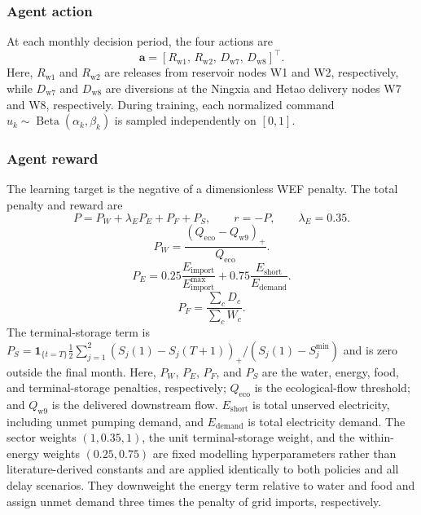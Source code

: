 \documentclass [a4paper,fleqn] {cas-dc}
\begin{document}
\subsubsection{Agent action}
\label{sec321}
At each monthly decision period, the four actions are
\begin{equation}
  \mathbf a=[R_{\mathrm{w1}},\,R_{\mathrm{w2}},\,D_{\mathrm{w7}},\,D_{\mathrm{w8}}]^{\top}.
  \label{eq:action-vector}
\end{equation}
Here, $R_{\mathrm{w1}}$ and $R_{\mathrm{w2}}$ are releases from reservoir nodes W1 and W2, respectively, while $D_{\mathrm{w7}}$ and $D_{\mathrm{w8}}$ are diversions at the Ningxia and Hetao delivery nodes W7 and W8, respectively. During training, each normalized command $u_k\sim\operatorname{Beta}(\alpha_k,\beta_k)$ is sampled independently on $[0,1]$. 


\subsubsection{Agent reward}
\label{sec322}

The learning target is the negative of a dimensionless WEF penalty. The total penalty and reward are
\begin{equation}
  P=P_W+\lambda_E P_E+P_F+P_S,
  \qquad r=-P,
  \qquad \lambda_E=0.35.
  \label{eq:wef-reward}
\end{equation}
\begin{equation}
  P_W=\frac{\left(Q_{\mathrm{eco}}-Q_{\mathrm{w9}}\right)_+}{Q_{\mathrm{eco}}}.
  \label{eq:water-penalty}
\end{equation}
\begin{equation}
  P_E=0.25\frac{E_{\mathrm{import}}}{E_{\mathrm{import}}^{\max}}
      +0.75\frac{E_{\mathrm{short}}}{E_{\mathrm{demand}}}.
  \label{eq:energy-penalty}
\end{equation}
\begin{equation}
  P_F=\frac{\sum_c D_c}{\sum_c W_c}.
  \label{eq:food-penalty}
\end{equation}
The terminal-storage term is $P_S=\mathbf{1}_{\{t=T\}}\frac{1}{2}\sum_{j=1}^{2}(S_j(1)-S_j(T+1))_+/(S_j(1)-S_j^{\min})$ and is zero outside the final month. Here, $P_W$, $P_E$, $P_F$, and $P_S$ are the water, energy, food, and terminal-storage penalties, respectively; $Q_{\mathrm{eco}}$ is the ecological-flow threshold; and $Q_{\mathrm{w9}}$ is the delivered downstream flow. $E_{\mathrm{short}}$ is total unserved electricity, including unmet pumping demand, and $E_{\mathrm{demand}}$ is total electricity demand. The sector weights $(1,0.35,1)$, the unit terminal-storage weight, and the within-energy weights $(0.25,0.75)$ are fixed modelling hyperparameters rather than literature-derived constants and are applied identically to both policies and all delay scenarios. They downweight the energy term relative to water and food and assign unmet demand three times the penalty of grid imports, respectively.
\end{document}

